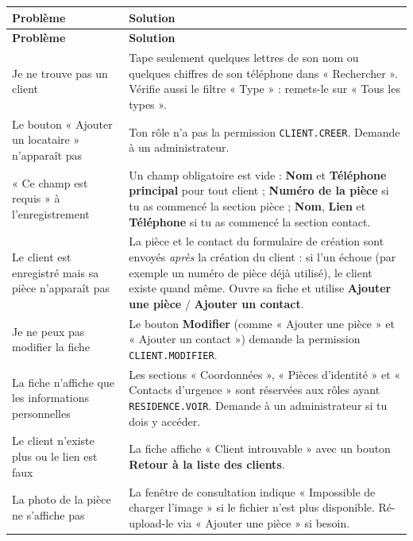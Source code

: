 \documentclass[12pt,a4paper]{article}
\begin{document}
\begin{longtable}{p{6cm}p{9cm}}
\toprule
\textbf{Problème} & \textbf{Solution} \\
\midrule
\endfirsthead
\toprule
\textbf{Problème} & \textbf{Solution} \\
\midrule
\endhead
\bottomrule
\endfoot
\bottomrule
\endlastfoot

Je ne trouve pas un client & Tape seulement quelques lettres de son nom ou quelques chiffres de son téléphone dans « Rechercher ». Vérifie aussi le filtre « Type » : remets-le sur « Tous les types ». \\

Le bouton « Ajouter un locataire » n'apparaît pas & Ton rôle n'a pas la permission \texttt{CLIENT.CREER}. Demande à un administrateur. \\

« Ce champ est requis » à l'enregistrement & Un champ obligatoire est vide : \textbf{Nom} et \textbf{Téléphone principal} pour tout client ; \textbf{Numéro de la pièce} si tu as commencé la section pièce ; \textbf{Nom}, \textbf{Lien} et \textbf{Téléphone} si tu as commencé la section contact. \\

Le client est enregistré mais sa pièce n'apparaît pas & La pièce et le contact du formulaire de création sont envoyés \emph{après} la création du client : si l'un échoue (par exemple un numéro de pièce déjà utilisé), le client existe quand même. Ouvre sa fiche et utilise \textbf{Ajouter une pièce} / \textbf{Ajouter un contact}. \\

Je ne peux pas modifier la fiche & Le bouton \textbf{Modifier} (comme « Ajouter une pièce » et « Ajouter un contact ») demande la permission \texttt{CLIENT.MODIFIER}. \\

La fiche n'affiche que les informations personnelles & Les sections « Coordonnées », « Pièces d'identité » et « Contacts d'urgence » sont réservées aux rôles ayant \texttt{RESIDENCE.VOIR}. Demande à un administrateur si tu dois y accéder. \\

Le client n'existe plus ou le lien est faux & La fiche affiche « Client introuvable » avec un bouton \textbf{Retour à la liste des clients}. \\

La photo de la pièce ne s'affiche pas & La fenêtre de consultation indique « Impossible de charger l'image » si le fichier n'est plus disponible. Ré-upload-le via « Ajouter une pièce » si besoin. \\

\end{longtable}
\end{document}
